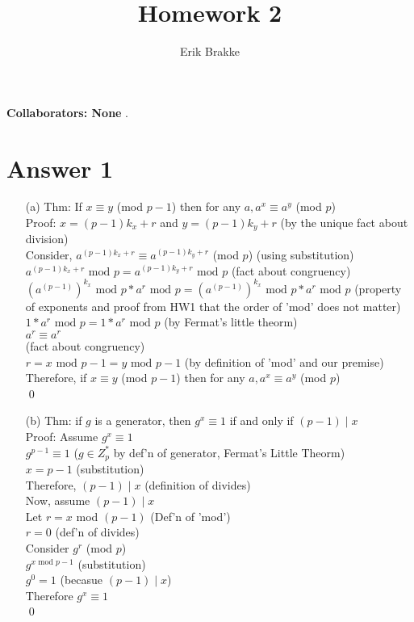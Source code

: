 \documentclass[11pt]{article}
\providecommand{\myparab}[1]{\smallskip\noindent\textbf{#1} }
\theoremstyle{definition}
\begin{document}
\title{Homework 2}
\author{Erik Brakke}
\maketitle

\thispagestyle{fancy}

\myparab{Collaborators: None}  .
 
 
\section*{Answer 1}
\begin{enumerate}
	\item[(a)]
	Thm: If $x \equiv y$ (mod $p-1$) then for any $a, a^x \equiv a^y$ (mod $p$)\\
	\newline
	Proof:  $x = (p-1)k_x + r$ and $y = (p-1)k_y + r$ (by the unique fact about division)\\
	Consider, $a^{(p-1)k_x + r} \equiv a^{(p-1)k_y + r}$ (mod $p$) (using substitution)\\
	$a^{(p-1)k_x + r} \text{ mod } p = a^{(p-1)k_y + r} \text{ mod } p$ (fact about congruency)\\
	$(a^{(p-1)})^{k_x} \text{ mod } p * a^r \text{ mod } p = (a^{(p-1)})^{k_x} \text{ mod } p * a^r \text{ mod } p$ (property of exponents and proof from HW1 that the order of 'mod' does not matter)\\
	$1 * a^r \text{ mod } p = 1 * a^r \text{ mod } p$ (by Fermat's little theorm)\\
	$a^r \equiv a^r$\\ (fact about congruency)\\
	$r = x \text{ mod } p-1 = y \text{ mod } p-1$ (by definition of 'mod' and our premise)\\
	Therefore, if $x \equiv y$ (mod $p-1$) then for any $a, a^x \equiv a^y$ (mod $p$)\\
	\qed

	\item[(b)]
	Thm: if $g$ is a generator, then $g^x \equiv 1$ if and only if $(p-1) \mid x$\\
	\newline
	Proof: Assume $g^x \equiv 1$\\
	$g^{p-1} \equiv 1$ ($g \in Z^*_p$ by def'n of generator, Fermat's Little Theorm)\\
	$x = p-1$ (substitution)\\
	Therefore, $(p-1) \mid x$ (definition of divides)\\
	\newline
	Now, assume $(p-1) \mid x$\\
	Let $r = x$ mod $(p-1)$ (Def'n of 'mod')\\
	$r = 0$ (def'n of divides)\\
	Consider $g^r$ (mod $p$)\\
	$g^{x \text{ mod } p-1}$ (substitution)\\
	$g^0 = 1$ (becasue $(p-1) \mid x$)\\
	Therefore $g^x \equiv 1$\\
	\qed


\end{enumerate}
\end{document}
